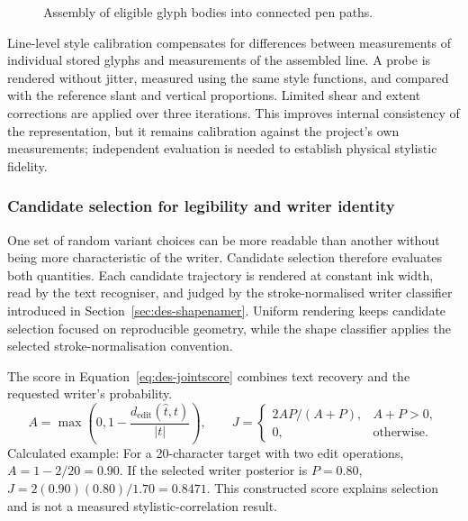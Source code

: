 \begin{figure}[!htbp]\centering
{}
\caption{Assembly of eligible glyph bodies into connected pen paths.~\cite{brauneevidence2026,braunepipeline2026}}
\label{fig:des-joins}
\end{figure}

Line-level style calibration compensates for differences between measurements of individual stored glyphs and measurements of the assembled line. A probe is rendered without jitter, measured using the same style functions, and compared with the reference slant and vertical proportions. Limited shear and extent corrections are applied over three iterations. This improves internal consistency of the representation, but it remains calibration against the project's own measurements; independent evaluation is needed to establish physical stylistic fidelity.~\cite[style.py; synthesise.py; reproduce.py]{braunepipeline2026}

\subsubsection{Candidate selection for legibility and writer identity}
\label{sec:des-selection}
One set of random variant choices can be more readable than another without being more characteristic of the writer. Candidate selection therefore evaluates both quantities. Each candidate trajectory is rendered at constant ink width, read by the text recogniser, and judged by the stroke-normalised writer classifier introduced in Section~\ref{sec:des-shapenamer}. Uniform rendering keeps candidate selection focused on reproducible geometry, while the shape classifier applies the selected stroke-normalisation convention.~\cite[style.py; synthesise.py; reproduce.py]{braunepipeline2026}


The score in Equation~\ref{eq:des-jointscore} combines text recovery and the requested writer's probability.
\begin{equation}
A=\max\left(0,1-\frac{d_{\mathrm{edit}}(\widehat t,t)}{|t|}\right),\qquad
J=\begin{cases}2AP/(A+P),&A+P>0,\\0,&\text{otherwise}.\end{cases}
\label{eq:des-jointscore}
\end{equation}
Calculated example: For a 20-character target with two edit operations, $A=1-2/20=0.90$. If the selected writer posterior is $P=0.80$, $J=2(0.90)(0.80)/1.70=0.8471$. This constructed score explains selection and is not a measured stylistic-correlation result. \cite[recognise.py, CharAcc; synthesise.py, SynthesizeJointBestOf]{braunepipeline2026}

